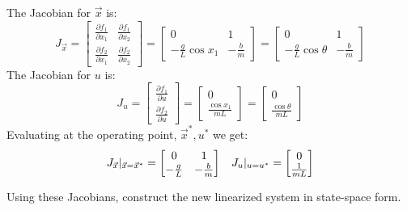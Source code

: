 \begin{enumerate}
{    The Jacobian for $\vec{x}$ is:
    $$J_{\vec{x}} =
    \begin{bmatrix} \frac{\partial f_{1}}{\partial x_{1}} & \frac{\partial f_{1}}{\partial x_{2}} \\
    \frac{\partial f_{2}}{\partial x_{1}} & \frac{\partial f_{2}}{\partial x_{2}}
    \end{bmatrix} = 
    \begin{bmatrix} 0 & 1 \\
    -\frac{g}{L} \cos x_{1} & -\frac{b}{m} 
    \end{bmatrix} = 
    \begin{bmatrix} 0 & 1 \\
    -\frac{g}{L} \cos \theta & -\frac{b}{m} 
    \end{bmatrix}
    $$
    The Jacobian for $u$ is:
    $$J_{u} =
    \begin{bmatrix} \frac{\partial f_{1}}{\partial u} \\ \frac{\partial f_{2}}{\partial u} \end{bmatrix} =
    \begin{bmatrix} 0 \\ \frac{\cos x_{1}}{mL} \end{bmatrix} = 
    \begin{bmatrix} 0 \\ \frac{\cos \theta}{mL} \end{bmatrix}
    $$
    Evaluating at the operating point, $\vec{x}^{*}, u^{*}$ we get:
    $$J_{\vec{x}} |_{\vec{x} = \vec{x}^{*}} =
    \begin{bmatrix} 0 & 1 \\
    -\frac{g}{L} & -\frac{b}{m} 
    \end{bmatrix} \hspace{0.3 cm}
    J_{u} |_{u = u^{*}} =
    \begin{bmatrix} 0 \\ \frac{1}{mL} \end{bmatrix}
    $$
  }

  \qitem Using these Jacobians, construct the new linearized system in state-space form.



\end{enumerate}
